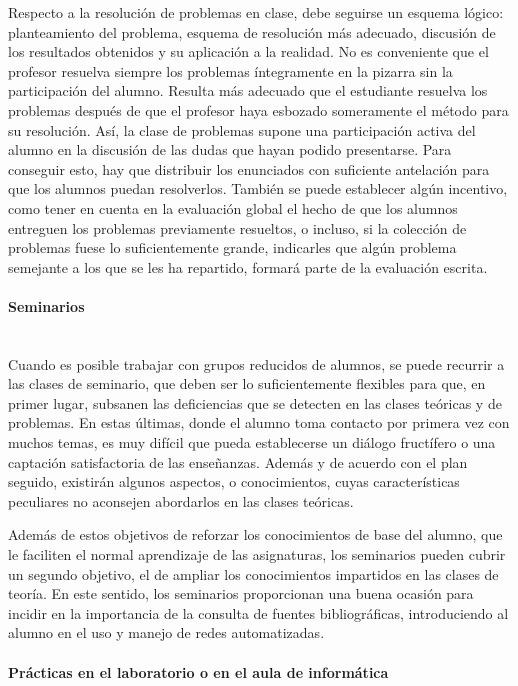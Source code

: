 Respecto a la resolución de problemas en clase, debe seguirse un esquema lógico: planteamiento del problema, esquema de resolución más adecuado, discusión de los resultados obtenidos y su aplicación a la realidad. No es conveniente que el profesor resuelva siempre los problemas íntegramente en la pizarra sin la participación del alumno. Resulta más adecuado que el estudiante resuelva los problemas después de que el profesor haya esbozado someramente el método para su resolución. Así, la clase de problemas supone una participación activa del alumno en la discusión de las dudas que hayan podido presentarse. Para conseguir esto, hay que distribuir los enunciados con suficiente antelación para que los alumnos puedan resolverlos. También se puede establecer algún incentivo, como tener en cuenta en la evaluación global el hecho de que los alumnos entreguen los  problemas previamente resueltos, o incluso, si la colección de problemas fuese lo suficientemente grande, indicarles que algún problema semejante a los que se les ha repartido, formará parte de la evaluación escrita.


\paragraph{Seminarios\\\\}

Cuando es posible trabajar con grupos reducidos de alumnos, se puede recurrir a las clases de seminario, que deben ser lo suficientemente flexibles para que, en primer lugar, subsanen las deficiencias que se detecten en las clases teóricas y de problemas. En estas últimas, donde el alumno toma contacto por primera vez con muchos temas, es muy difícil que pueda establecerse un diálogo fructífero o una captación satisfactoria de las enseñanzas. Además y de acuerdo con el plan seguido, existirán algunos aspectos, o conocimientos, cuyas características peculiares no aconsejen abordarlos en las clases teóricas.

Además de estos objetivos de reforzar los conocimientos de base del alumno, que le faciliten el normal aprendizaje de las asignaturas, los seminarios pueden cubrir un segundo objetivo, el de ampliar los conocimientos impartidos en las clases de teoría. En este sentido, los seminarios proporcionan una buena ocasión para incidir en la importancia de la consulta de fuentes bibliográficas, introduciendo al alumno en el uso y manejo de redes automatizadas.


\paragraph{Prácticas en el laboratorio o en el aula de informática\\\\} \label{sec:practicas}


